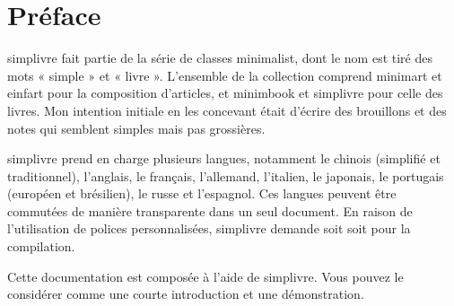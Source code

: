 \documentclass[English,Chinese,French,puretext]{simplivre}
\providecommand{\minimalist}{\textsf{minimalist}}
\providecommand{\minimart}{\textsf{minimart}}
\providecommand{\minimbook}{\textsf{minimbook}}
\providecommand{\einfart}{\textsf{einfart}}
\providecommand{\simplivre}{\textsf{simplivre}}
\begin{document}
\frontmatter

\begin{titlepage} %
%
\end{titlepage}%
\cleardoublepage%


\chapter*{Préface}

\simplivre{} fait partie de la série de classes \minimalist{}, dont le nom est tiré des mots « simple » et « livre ». L'ensemble de la collection comprend \minimart{} et \einfart{} pour la composition d'articles, et \minimbook{} et \simplivre{} pour celle des livres. Mon intention initiale en les concevant était d'écrire des brouillons et des notes qui semblent simples mais pas grossières.

\simplivre{} prend en charge plusieurs langues, notamment le chinois (simplifié et traditionnel), l'anglais, le français, l'allemand, l'italien, le japonais, le portugais (européen et brésilien), le russe et l'espagnol. Ces langues peuvent être commutées de manière transparente dans un seul document. En raison de l'utilisation de polices personnalisées, \simplivre{} demande soit  soit  pour la compilation.

Cette documentation est composée à l'aide de \simplivre{}. Vous pouvez le considérer comme une courte introduction et une démonstration.
\end{document}
